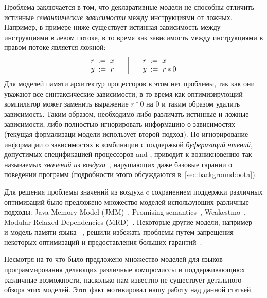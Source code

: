 Проблема заключается в том, что декларативные модели не способны 
отличить истинные \emph{семантические зависимости} между инструкциями от ложных.
Например, в примере ниже существует истинная зависимость между 
инструкциями в левом потоке, в то время как зависимость между 
инструкциями в правом потоке является ложной:
\[\begin{array}{l@{\qquad}|@{\qquad}l}
\readInst{}{r}{x} & \readInst{}{r}{x} \\
\writeInst{}{y}{r} & \readInst{}{y}{r * 0} \\
\end{array}\]
Для моделей памяти архитектур процессоров в этом нет проблемы, 
так как они уважают все синтаксические зависимости, 
в то время как оптимизирующий компилятор может заменить выражение 
$r * 0$ на $0$ и таким образом удалить зависимость. 
Таким образом, необходимо либо различать истинные и ложные зависимости, 
либо полностью игнорировать информацию о зависимостях 
(текущая формализаци модели \CPP использует второй подход).
Но игнорирование информации о зависимостях в комбинации с 
поддержкой \emph{буферизаций чтений}, допустимых 
спецификацией процессоров \ARM and \POWER, 
приводит к возникновению так называемых 
\emph{значений из воздуха}~\cite{Boehm-Demsky:MSPC14}, 
нарушающих даже базовые гарании о поведении программ
(подробности этого обсуждаются в~\cref{sec:background:oota}).

Для решения проблемы значений из воздуха c сохранением
поддержки различных оптимизаций было предложено 
множество моделей использующих различные подходы:
Java Memory Model (JMM)~\cite{Manson-al:POPL05}, Promising semantics~\cite{Kang-al:POPL17,Lee-al:PLDI20},
Weakestmo~\cite{Chakraborty-Vafeiadis:POPL19}, Modular Relaxed Dependencies (MRD)~\cite{Paviotti-al:ESOP20}.
Некоторые другие модели, например \RCMM~\cite{Lahav-al:PLDI17} и модель памяти языка \OCaml~\cite{Dolan-al:PLDI18},
решили избежать проблемы путем запрещения некоторых оптимизаций и предоставления больших гарантий~\cite{Ou-Demsky:OOPSLA18}.

Несмотря на то что было предложено множество моделей для языков программирования
делающих различные компромиссы и поддерживающиюх различные возможности, 
насколько нам известно не существует детального обзора этих моделей. 
Этот факт мотивировал нашу работу над данной статьей.
